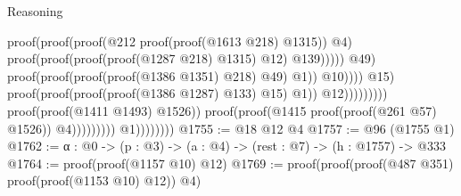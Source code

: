 \begin{lexlean}{Reasoning}
\begin{coremodule}
                                                                                      proof(proof(proof(@212
                                                                                              proof(proof(@1613
                                                                                                    @218)
                                                                                                  @1315))
                                                                                            @4)
                                                                                          proof(proof(proof(proof(@1287
                                                                                                    @218)
                                                                                                  @1315)
                                                                                                @12)
                                                                                              @139)))))
                                                                                @49)
                                                                              proof(proof(proof(proof(@1386
                                                                                        @1351)
                                                                                      @218)
                                                                                    @49)
                                                                                  @1))
                                                                            @10))))
                                                                  @15)
                                                                proof(proof(proof(proof(@1386 @1287)
                                                                        @133)
                                                                      @15)
                                                                    @1))
                                                              @12)))))))))
                                        proof(proof(@1411 @1493) @1526))
                                      proof(proof(@1415 proof(proof(@261 @57) @1526)) @4)))))))))
                    @1))))))))
@1755 := @18 @12 @4
@1757 := @96 (@1755 @1)
@1762 := {α : @0} -> (p : @3) -> (a : @4) -> (rest : @7) -> (h : @1757) -> @333
@1764 := proof(proof(@1157 @10) @12)
@1769 := proof(proof(proof(@487 @351) proof(proof(@1153 @10) @12)) @4)

\end{coremodule}
\end{lexlean}
